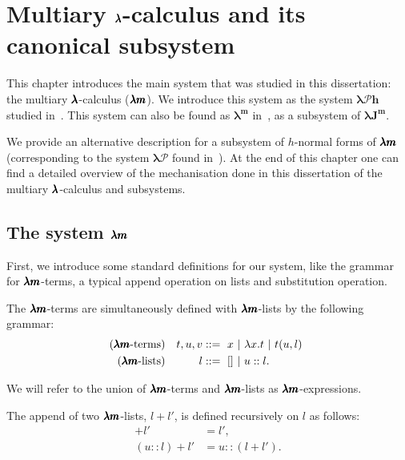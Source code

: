 \chapter{Multiary $\pmb{\lambda}$-calculus and its canonical subsystem}
\label{c:multiary}

This chapter introduces the main system that was studied in this dissertation: the multiary $\pmb{\lambda}$-calculus ($\pmb{\lambda m}$).
We introduce this system as the system $\pmb{\lambda \mathcal{P}h}$ studied in~\cite[Chapter~3]{JCES2002}.
This system can also be found as $\pmb{\lambda^m}$ in~\cite[Section~3]{JCESLuis}, as a subsystem of $\pmb{\lambda J^m}$.

We provide an alternative description for a subsystem of $h$-normal forms of $\pmb{\lambda m}$ (corresponding to the system $\pmb{\lambda \mathcal{P}}$ found in~\cite[Chapter~3]{JCES2002}).
At the end of this chapter one can find a detailed overview of the mechanisation done in this dissertation of the multiary $\pmb{\lambda}$-calculus and subsystems.

\section{The system $\pmb{\lambda m}$}

First, we introduce some standard definitions for our system, like the grammar for $\pmb{\lambda m}$-terms, a typical append operation on lists and substitution operation.

\begin{definition}
  The $\pmb{\lambda m}$-terms are simultaneously defined with $\pmb{\lambda m}$-lists by the following grammar:  
  \begin{align*} 
    (\pmb{\lambda m} \text{-terms}) && t, u, v &::= \ x \ | \ \lambda x . t \ | \ t(u, l) \ \\
    (\pmb{\lambda m} \text{-lists}) && l       &::= \ []\  | \ u :: l.
  \end{align*}

  We will refer to the union of $\pmb{\lambda m}$-terms and $\pmb{\lambda m}$-lists as $\pmb{\lambda m}$-expressions.
\end{definition}

\begin{definition}[Append]
  The append of two $\pmb{\lambda m}$-lists, $l + l'$, is defined recursively on $l$ as follows:
  \begin{align*}
    [] + l'     &= l', \\
    (u::l) + l' &= u::(l + l').
  \end{align*}
\end{definition}

